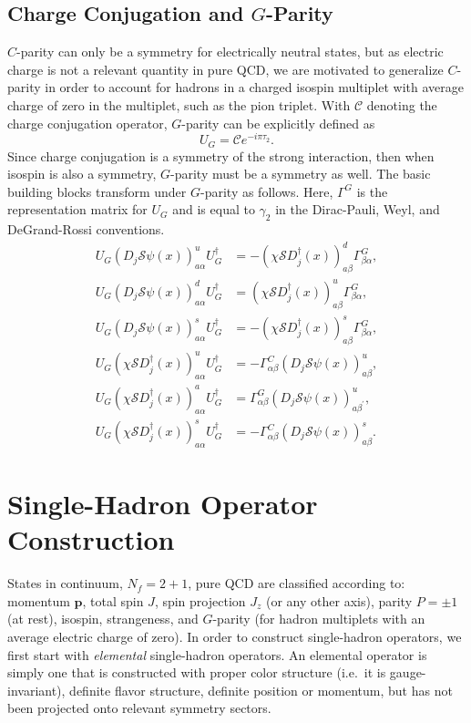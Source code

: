     \subsection{Charge Conjugation and $G$-Parity}
    $C$-parity can only be a symmetry for electrically neutral states, but as electric charge is not a relevant quantity in pure QCD, we are motivated to generalize $C$-parity in order to account for hadrons in a charged isospin multiplet with average charge of zero in the multiplet, such as the pion triplet. With $\mathcal C$ denoting the charge conjugation operator, $G$-parity can be explicitly defined as
    \begin{equation}
        U_G = \mathcal C e^{-i\pi\tau_2}.
    \end{equation}
    Since charge conjugation is a symmetry of the strong interaction, then when isospin is also a symmetry, $G$-parity must be a symmetry as well. The basic building blocks transform under $G$-parity as follows. Here, $\Gamma^G$ is the representation matrix for $U_G$ and is equal to $\gamma_2$ in the Dirac-Pauli, Weyl, and DeGrand-Rossi conventions.
    \begin{align} U_{G}\left(D_{j} \mathcal S \psi(x)\right)_{a \alpha}^{u} U_{G}^{\dagger} &=-\left(\chi \mathcal S D_{j}^{\dagger}(x)\right)_{a \beta}^{d} \Gamma_{\beta \alpha}^{G}, \\ U_{G}\left(D_{j}\mathcal S \psi(x)\right)_{a \alpha}^{d} U_{G}^{\dagger} &=\left(\chi \mathcal S D_{j}^{\dagger}(x)\right)_{a \beta}^{u} \Gamma_{\beta \alpha}^{G}, \\ U_{G}\left(D_{j} \mathcal S \psi(x)\right)_{a \alpha}^{s} U_{G}^{\dagger} &=-\left(\chi \mathcal S D_{j}^{\dagger}(x)\right)_{a \beta}^{s} \Gamma_{\beta \alpha}^{G}, \\ U_{G}\left(\chi \mathcal S D_{j}^{\dagger}(x)\right)_{a \alpha}^{u} U_{G}^{\dagger} &=-\Gamma_{\alpha \beta}^{C}\left(D_{j} \mathcal S \psi(x)\right)_{a \beta}^{u}, \\ U_{G}\left(\chi \mathcal S D_{j}^{\dagger}(x)\right)_{a \alpha}^{a} U_{G}^{\dagger} &=\Gamma_{\alpha \beta}^{G}\left(D_{j} \mathcal S \psi(x)\right)_{a \beta^{\prime}}^{u}, \\ U_{G}\left(\chi \mathcal S D_{j}^{\dagger}(x)\right)_{a \alpha}^{s} U_{G}^{\dagger} &=-\Gamma_{\alpha \beta}^{C}\left(D_{j} \mathcal S \psi(x)\right)_{a \beta}^{s}. \end{align}
    \section{Single-Hadron Operator Construction}
    States in continuum, $N_f=2+1$, pure QCD are classified according to: momentum $\boldsymbol p$, total spin $J$, spin projection $J_z$ (or any other axis), parity $P = \pm 1$ (at rest), isospin, strangeness, and $G$-parity (for hadron multiplets with an average electric charge of zero). In order to construct single-hadron operators, we first start with \emph{elemental} single-hadron operators. An elemental operator is simply one that is constructed with proper color structure (i.e.\ it is gauge-invariant), definite flavor structure, definite position or momentum, but has not been projected onto relevant symmetry sectors.

